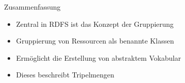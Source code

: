 \documentclass{beamer}
\begin{document}
\begin{frame}{Zusammenfassung}
	
	\begin{itemize}
		\item Zentral in RDFS ist das Konzept der Gruppierung
		\item Gruppierung von Ressourcen als benannte Klassen
		\item Ermöglicht die Erstellung von abstraktem Vokabular
		\item Dieses beschreibt Tripelmengen
	\end{itemize}
	
\end{frame}
\end{document}
